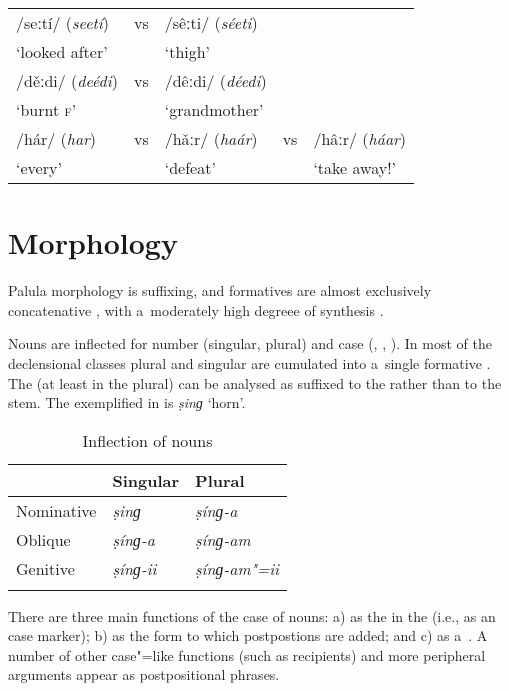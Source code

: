 \begin{table}[H]
\begin{tabularx}{\textwidth}{ l l l l l}
/seːtí/ (\textit{seetí})  &
vs &
/sêːti/ (\textit{séeti}) \\
`looked after' &
&
`thigh' \\
/děːdi/ (\textit{deédi})  &
vs &
/dêːdi/ (\textit{déedi})  \\
`burnt \textsc{f}' &
&
`grandmother' \\
/hár/ (\textit{har})  &
vs &
/hǎːr/ (\textit{haár})  &
vs &
/hâːr/ (\textit{háar}) \\
`every' &
&
`defeat' &
&
`take away!'\\
\end{tabularx}
\end{table}


\section{Morphology}
\label{sec:2-2}

Palula morphology is suffixing, and formatives are almost exclusively concatenative \citep{bickel_fusion_2013}, with a~moderately high degreee of synthesis \citep{bickel_inflectional_2013}. 


Nouns are inflected for number (singular, plural) and case (, , ). In most of the declensional classes  plural and  singular are cumulated into a~single formative \citep{bickel_exponence_2013}. The  (at least in the plural) can be analysed as suffixed to the  rather than to the  stem. The  exemplified in  is \textit{ṣinɡ} `horn'.

\begin{table}[ht]
\caption{Inflection of nouns}
\begin{tabularx}{\textwidth}{ Q Q Q }
\lsptoprule
&
Singular &
Plural
\\\hline
Nominative &
\textit{ṣinɡ} &
\textit{ṣínɡ-a}\\
Oblique &
\textit{ṣínɡ-a} &
\textit{ṣínɡ-am}\\ 
Genitive &
\textit{ṣínɡ-ii} &
\textit{ṣínɡ-am"=ii}
\\\lspbottomrule
\end{tabularx}
\label{tab:2-nouns}
\end{table}


There are three main functions of the  case of nouns: a) as the   in the  (i.e., as an  case marker); b) as the form to which postpostions are added; and c) as a~. A number of other case"=like functions (such as recipients) and more peripheral arguments appear as postpositional phrases.


